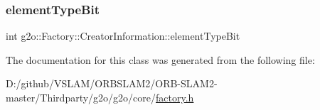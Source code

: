 \mbox{\label{classg2o_1_1_factory_1_1_creator_information_ab9fa4c8aec27d204f5ae6a7510c4e339}} 
\subsubsection{\texorpdfstring{element\+Type\+Bit}{elementTypeBit}}
{\footnotesize\ttfamily int g2o\+::\+Factory\+::\+Creator\+Information\+::element\+Type\+Bit}



The documentation for this class was generated from the following file\+:\begin{DoxyCompactItemize}
\item 
D\+:/github/\+V\+S\+L\+A\+M/\+O\+R\+B\+S\+L\+A\+M2/\+O\+R\+B-\/\+S\+L\+A\+M2-\/master/\+Thirdparty/g2o/g2o/core/\mbox{\hyperlink{factory_8h}{factory.\+h}}\end{DoxyCompactItemize}
